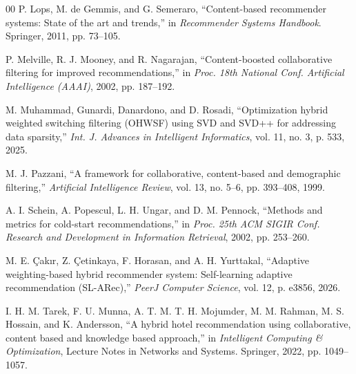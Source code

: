 \documentclass[conference]{IEEEtran}
\begin{document}
\begin{thebibliography}{00}
 P. Lops, M. de Gemmis, and G. Semeraro,
``Content-based recommender systems: State of the art and trends,''
in \textit{Recommender Systems Handbook}. Springer, 2011,
pp. 73--105.

 P. Melville, R. J. Mooney, and R. Nagarajan,
``Content-boosted collaborative filtering for improved
recommendations,'' in \textit{Proc. 18th National Conf. Artificial
Intelligence (AAAI)}, 2002, pp. 187--192.

 M. Muhammad, Gunardi, Danardono, and D. Rosadi,
``Optimization hybrid weighted switching filtering (OHWSF) using SVD
and SVD++ for addressing data sparsity,'' \textit{Int. J. Advances in
Intelligent Informatics}, vol. 11, no. 3, p. 533, 2025.

 M. J. Pazzani, ``A framework for
collaborative, content-based and demographic filtering,''
\textit{Artificial Intelligence Review}, vol. 13, no. 5--6,
pp. 393--408, 1999.

 A. I. Schein, A. Popescul, L. H. Ungar, and
D. M. Pennock, ``Methods and metrics for cold-start
recommendations,'' in \textit{Proc. 25th ACM SIGIR Conf. Research and
Development in Information Retrieval}, 2002, pp. 253--260.

 M. E. Çakır, Z. Çetinkaya, F. Horasan, and
A. H. Yurttakal, ``Adaptive weighting-based hybrid recommender
system: Self-learning adaptive recommendation (SL-ARec),''
\textit{PeerJ Computer Science}, vol. 12, p. e3856, 2026.

 I. H. M. Tarek, F. U. Munna,
A. T. M. T. H. Mojumder, M. M. Rahman, M. S. Hossain, and
K. Andersson, ``A hybrid hotel recommendation using collaborative,
content based and knowledge based approach,'' in \textit{Intelligent
Computing \& Optimization}, Lecture Notes in Networks and Systems.
Springer, 2022, pp. 1049--1057.

\end{thebibliography}
\end{document}
